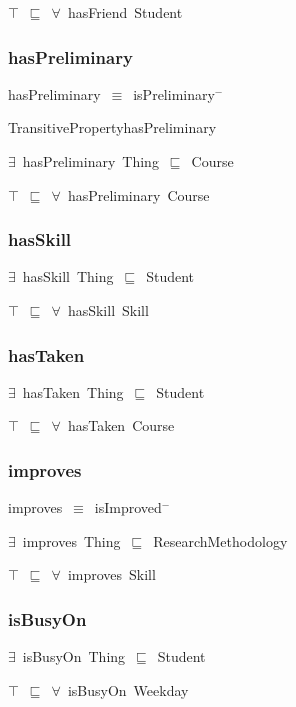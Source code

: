 \documentclass{article}
\begin{document}
\ensuremath{\top}~\ensuremath{\sqsubseteq}~\ensuremath{\forall}~hasFriend~Student

\subsubsection*{hasPreliminary}

hasPreliminary~\ensuremath{\equiv}~isPreliminary\ensuremath{^-}

TransitivePropertyhasPreliminary

\ensuremath{\exists}~hasPreliminary~Thing~\ensuremath{\sqsubseteq}~Course

\ensuremath{\top}~\ensuremath{\sqsubseteq}~\ensuremath{\forall}~hasPreliminary~Course

\subsubsection*{hasSkill}

\ensuremath{\exists}~hasSkill~Thing~\ensuremath{\sqsubseteq}~Student

\ensuremath{\top}~\ensuremath{\sqsubseteq}~\ensuremath{\forall}~hasSkill~Skill

\subsubsection*{hasTaken}

\ensuremath{\exists}~hasTaken~Thing~\ensuremath{\sqsubseteq}~Student

\ensuremath{\top}~\ensuremath{\sqsubseteq}~\ensuremath{\forall}~hasTaken~Course

\subsubsection*{improves}

improves~\ensuremath{\equiv}~isImproved\ensuremath{^-}

\ensuremath{\exists}~improves~Thing~\ensuremath{\sqsubseteq}~ResearchMethodology

\ensuremath{\top}~\ensuremath{\sqsubseteq}~\ensuremath{\forall}~improves~Skill

\subsubsection*{isBusyOn}

\ensuremath{\exists}~isBusyOn~Thing~\ensuremath{\sqsubseteq}~Student

\ensuremath{\top}~\ensuremath{\sqsubseteq}~\ensuremath{\forall}~isBusyOn~Weekday
\end{document}
